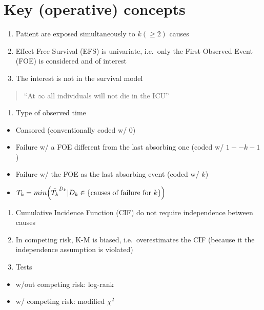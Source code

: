 \documentclass[]{book}
\providecommand{\tightlist}{%
  \setlength{\itemsep}{0pt}\setlength{\parskip}{0pt}}
\theoremstyle{definition}
\theoremstyle{definition}
\theoremstyle{definition}
\theoremstyle{remark}
\begin{document}
\section{Key (operative) concepts}\label{key3}

\begin{enumerate}
\def\labelenumi{\arabic{enumi}.}
\item
  Patient are exposed simultaneously to \(k (\geq2)\) causes
\item
  Effect Free Survival (EFS) is univariate, i.e.~only the First Observed
  Event (FOE) is considered and of interest
\item
  The interest is not in the survival model
\end{enumerate}

\begin{quote}
``At \(\infty\) all individuals will not die in the ICU''
\end{quote}

\begin{enumerate}
\def\labelenumi{\arabic{enumi}.}
\setcounter{enumi}{3}
\tightlist
\item
  Type of observed time
\end{enumerate}

\begin{itemize}
\tightlist
\item
  Cansored (conventionally coded w/ \(0\))
\item
  Failure w/ a FOE different from the last absorbing one (coded w/
  \(1 -- k-1\))
\item
  Failure w/ the FOE as the last absorbing event (coded w/ \(k\))
\item
  \(T_k = min\Bigl(\tilde{T_k}^{D_k} |  D_k \in \{\textrm{causes of failure for }k\} \Bigr)\)
\end{itemize}

\begin{enumerate}
\def\labelenumi{\arabic{enumi}.}
\setcounter{enumi}{4}
\item
  Cumulative Incidence Function (CIF) do not require independence
  between causes
\item
  In competing risk, K-M is biased, i.e.~overestimates the CIF (because
  it the independence assumption is violated)
\item
  Tests
\end{enumerate}

\begin{itemize}
\tightlist
\item
  w/out competing risk: log-rank
\item
  w/ competing risk: modified \(\chi^2\) \citep{gray1988class}
\end{itemize}
\end{document}
